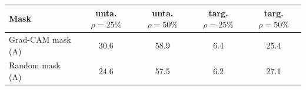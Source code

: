 \begin{tabular}{lcccc}
\toprule
Mask & unta. $\rho=25\%$ & unta. $\rho=50\%$ & targ. $\rho=25\%$ & targ. $\rho=50\%$ \\
\midrule
Grad-CAM mask (A) & 30.6 & 58.9 & 6.4 & 25.4 \\
Random mask (A) & 24.6 & 57.5 & 6.2 & 27.1 \\
\bottomrule
\end{tabular}

